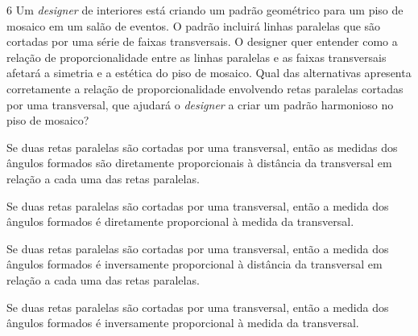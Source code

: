 \num{6} Um \textit{designer} de interiores está criando um padrão geométrico
para um piso de mosaico em um salão de eventos. O padrão incluirá linhas paralelas
que são cortadas por uma série de faixas transversais. O designer quer entender como
a relação de proporcionalidade entre as linhas paralelas e as faixas transversais
afetará a simetria e a estética do piso de mosaico. Qual das alternativas apresenta
corretamente a relação de proporcionalidade envolvendo retas paralelas cortadas por
uma transversal, que ajudará o \textit{designer} a criar um padrão harmonioso no
piso de mosaico?

\begin{escolha}
\item Se duas retas paralelas são cortadas por uma transversal, então as medidas dos ângulos formados são diretamente proporcionais à distância da transversal em relação a cada uma das retas paralelas.

\item Se duas retas paralelas são cortadas por uma transversal, então a medida dos ângulos formados é diretamente proporcional à medida da transversal.

\item Se duas retas paralelas são cortadas por uma transversal, então a medida dos ângulos formados é inversamente proporcional à distância da transversal em relação a cada uma das retas paralelas.

\item Se duas retas paralelas são cortadas por uma transversal, então a medida dos ângulos formados é inversamente proporcional à medida da transversal.
\end{escolha}



